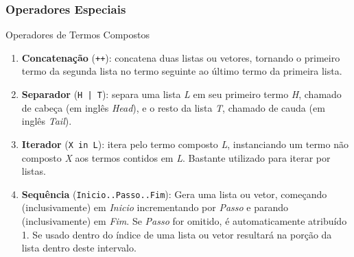 \begin{frame}[fragile,c]
    \frametitle{Operadores Especiais \textrm{\MakeUppercase{}}}
    
    \begin{block}{Operadores de Termos Compostos}
    	
    	\begin{enumerate}
        
            \item \textbf{Concatenação}\/ (\verb!++!): concatena duas listas ou vetores, tornando o primeiro termo 
            da segunda lista no termo seguinte ao último termo da primeira lista.

            \item \textbf{Separador}\/ (\verb!H | T!): separa uma lista \emph{L} em seu primeiro termo \emph{H}, 
            chamado de cabeça (em inglês \textit{Head}), e o resto da lista \emph{T}, chamado de cauda (em inglês \textit{Tail}).

            \item \textbf{Iterador}\/ (\verb!X in L!): itera pelo termo composto \emph{L}, instanciando um termo
            não composto \emph{X} aos termos contidos em \emph{L}. Bastante utilizado para iterar por listas.
            \item \textbf{Sequência }\/ (\verb!Inicio..Passo..Fim!): Gera uma lista ou vetor, começando 
            (inclusivamente) em \textit{Inicio} incrementando por \textit{Passo} e parando (inclusivamente) em 
            \textit{Fim}. Se \textit{Passo} for omitido, é automaticamente atribuído 1. Se usado dentro do 
            índice de uma lista ou vetor resultará na porção da lista dentro deste intervalo.
            
    	\end{enumerate}
        
    \end{block}
    
\end{frame}


